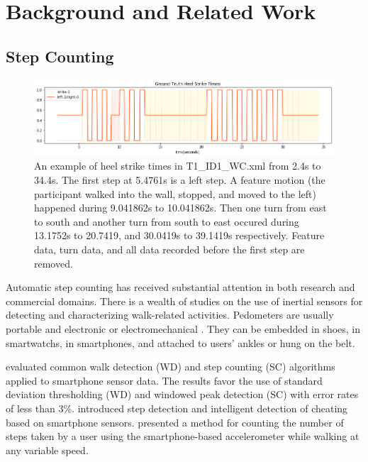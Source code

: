 \documentclass[11pt]{article}
\begin{document}
{\section{Background and Related Work}

\subsection{Step Counting}

\begin{figure}[htb]
\centering
\includegraphics[scale=0.5]{ground_truth_2}
\caption{An example of heel strike times in T1\_ID1\_WC.xml from 2.4s to 34.4s. The first step at 5.4761s is a left step. A feature motion (the participant walked into the wall, stopped, and moved to the left) happened during 9.041862s to 10.041862s. Then one turn from east to south and another turn from south to east occured during 13.1752s to 20.7419, and 30.0419s to 39.1419s respectively. Feature data, turn data, and all data recorded before the first step are removed.}
\label{fig:ground_truth}
\end{figure}


Automatic step counting has received substantial attention in both research and commercial domains. There is a wealth of studies on the use of inertial sensors for detecting and characterizing walk-related activities. Pedometers are usually portable and electronic or electromechanical \cite{wiki:pedometer}. They can be embedded in shoes, in smartwatchs, in  smartphones, and attached to users' ankles or hung on the belt.

\cite{brajdic2013walk} evaluated common walk detection (WD) and step counting (SC) algorithms applied to smartphone sensor data. The results favor the use of standard deviation thresholding (WD) and windowed peak detection (SC) with error rates of less than 3\%.
\cite{tomlein2012advanced} introduced step detection and intelligent detection of cheating based on smartphone sensors.
\cite{naqvib2012step} presented a method for counting the number of steps taken by a user using the smartphone-based accelerometer while walking at any variable speed.

}
\end{document}

